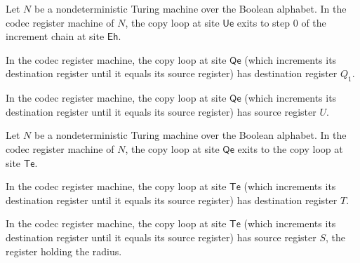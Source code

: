 \begin{lemma}
\label{Complexity.Codec.cpNext_Ue}
\leanok
{}
Let $N$ be a nondeterministic Turing machine over the Boolean alphabet. In the codec
register machine of $N$, the copy loop at site $\mathsf{Ue}$ exits to step $0$ of the
increment chain at site $\mathsf{Eh}$.
\end{lemma}

\begin{lemma}
\label{Complexity.Codec.cpDst_Qe}
\leanok
{}
In the codec register machine, the copy loop at site $\mathsf{Qe}$ (which increments its
destination register until it equals its source register) has destination register
$Q_1$.
\end{lemma}

\begin{lemma}
\label{Complexity.Codec.cpSrc_Qe}
\leanok
{}
In the codec register machine, the copy loop at site $\mathsf{Qe}$ (which increments its
destination register until it equals its source register) has source register $U$.
\end{lemma}

\begin{lemma}
\label{Complexity.Codec.cpNext_Qe}
\leanok
{}
Let $N$ be a nondeterministic Turing machine over the Boolean alphabet. In the codec
register machine of $N$, the copy loop at site $\mathsf{Qe}$ exits to the copy loop at
site $\mathsf{Te}$.
\end{lemma}

\begin{lemma}
\label{Complexity.Codec.cpDst_Te}
\leanok
{}
In the codec register machine, the copy loop at site $\mathsf{Te}$ (which increments its
destination register until it equals its source register) has destination register $T$.
\end{lemma}

\begin{lemma}
\label{Complexity.Codec.cpSrc_Te}
\leanok
{}
In the codec register machine, the copy loop at site $\mathsf{Te}$ (which increments its
destination register until it equals its source register) has source register $S$, the
register holding the radius.
\end{lemma}

